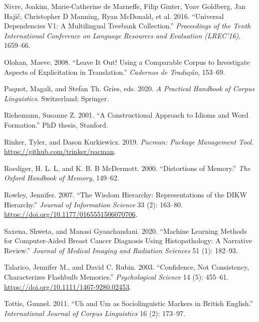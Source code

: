 \documentclass[
  letterpaper,
  DIV=11,
  numbers=noendperiod]{scrreport}
\newlength{\cslhangindent}
\newlength{\cslentryspacingunit} %
\newenvironment{CSLReferences}[2] %
 {%
  \setlength{\parindent}{0pt}
  \ifodd #1
  \let\oldpar\par
  \def\par{\hangindent=\cslhangindent\oldpar}
  \fi
  \setlength{\parskip}{#2\cslentryspacingunit}
 }%
 {}
\theoremstyle{definition}
\theoremstyle{remark}
\begin{document}
\begin{CSLReferences}{1}{0}
\leavevmode{}%
Nivre, Joakim, Marie-Catherine de Marneffe, Filip Ginter, Yoav Goldberg,
Jan Hajič, Christopher D Manning, Ryan McDonald, et al. 2016.
{``Universal Dependencies V1: A Multilingual Treebank Collection.''}
\emph{Proceedings of the Tenth International Conference on Language
Resources and Evaluation (LREC'16)}, 1659--66.

\leavevmode{}%
Olohan, Maeve. 2008. {``Leave It Out! Using a Comparable Corpus to
Investigate Aspects of Explicitation in Translation.''} \emph{Cadernos
de Tradução}, 153--69.

\leavevmode{}%
Paquot, Magali, and Stefan Th. Gries, eds. 2020. \emph{A Practical
Handbook of Corpus Linguistics}. Switzerland: Springer.

\leavevmode{}%
Riehemann, Susanne Z. 2001. {``A Constructional Approach to Idioms and
Word Formation.''} PhD thesis, Stanford.

\leavevmode{}%
Rinker, Tyler, and Dason Kurkiewicz. 2019. \emph{Pacman: Package
Management Tool}. \url{https://github.com/trinker/pacman}.

\leavevmode{}%
Roediger, H. L. L, and K. B. B McDermott. 2000. {``Distortions of
Memory.''} \emph{The Oxford Handbook of Memory}, 149--62.

\leavevmode{}%
Rowley, Jennifer. 2007. {``The Wisdom Hierarchy: Representations of the
DIKW Hierarchy.''} \emph{Journal of Information Science} 33 (2):
163--80. \url{https://doi.org/10.1177/0165551506070706}.

\leavevmode{}%
Saxena, Shweta, and Manasi Gyanchandani. 2020. {``Machine Learning
Methods for Computer-Aided Breast Cancer Diagnosis Using Histopathology:
A Narrative Review.''} \emph{Journal of Medical Imaging and Radiation
Sciences} 51 (1): 182--93.

\leavevmode{}%
Talarico, Jennifer M., and David C. Rubin. 2003. {``Confidence, Not
Consistency, Characterizes Flashbulb Memories.''} \emph{Psychological
Science} 14 (5): 455--61. \url{https://doi.org/10.1111/1467-9280.02453}.

\leavevmode{}%
Tottie, Gunnel. 2011. {``Uh and Um as Sociolinguistic Markers in British
English.''} \emph{International Journal of Corpus Linguistics} 16 (2):
173--97.


\end{CSLReferences}
\end{document}
